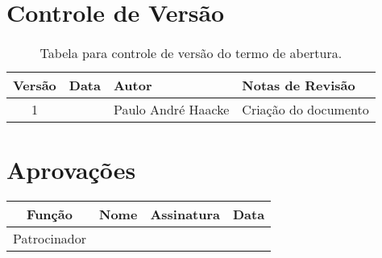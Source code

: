 \section{Controle de Versão}

\begin{table}[H]
	\begin{tabularx}{.9\textwidth}{| c | c | X | X |}
		\hline
		\textbf{Versão} & \textbf{Data} & \textbf{Autor}      & \textbf{Notas de Revisão} \\
		\hline
		1                &               & Paulo André Haacke & Criação do documento     \\
		\hline
	\end{tabularx}
	\centering
	\caption{Tabela para controle de versão do termo de abertura.}
\end{table}

\section{Aprovações}

\begin{table}[H]
	\begin{tabularx}{\textwidth}{| c | c | X | c |}
		\hline
		\textbf{Função} & \textbf{Nome}       & \textbf{Assinatura}      & \textbf{Data} \\
		\hline
		Patrocinador      & \projectSponsorName & \projectSponsorSignature &               \\
		\hline
	\end{tabularx}
	\centering
\end{table}

